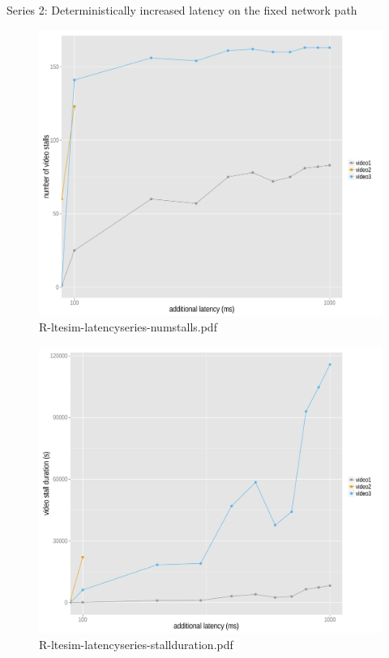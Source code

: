 Series 2: Deterministically increased latency on the fixed network path

\begin{figure}[htb]
	\centering
	\includegraphics[width=1.0\textwidth]{images/R-ltesim-latencyseries-numstalls.pdf}
	\caption{R-ltesim-latencyseries-numstalls.pdf}
\label{c5:fig:ltesim-latencyseries-numstalls}
\end{figure}

\begin{figure}[htb]
	\centering
	\includegraphics[width=1.0\textwidth]{images/R-ltesim-latencyseries-stallduration.pdf}
	\caption{R-ltesim-latencyseries-stallduration.pdf}
\label{c5:fig:ltesim-latencyseries-stallduration}
\end{figure}

